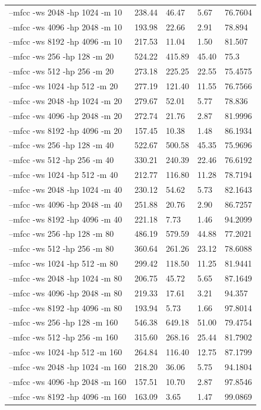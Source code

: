 \documentclass[12pt,oneside]{book}
\begin{document}
\begin{table}
\begin{tabular}{|l|l|l|l|l|}
--mfcc -ws 2048 -hp 1024 -m 10  &  238.44 &  46.47 &  5.67 &  76.7604 \\
--mfcc -ws 4096 -hp 2048 -m 10  &  193.98 &  22.66 &  2.91 &  78.894 \\
--mfcc -ws 8192 -hp 4096 -m 10  &  217.53 &  11.04 &  1.50 &  81.507 \\
--mfcc -ws 256  -hp 128  -m 20  &  524.22 & 415.89 & 45.40 &  75.3 \\
--mfcc -ws 512  -hp 256  -m 20  &  273.18 & 225.25 & 22.55 &  75.4575 \\
--mfcc -ws 1024 -hp 512  -m 20  &  277.19 & 121.40 & 11.55 &  76.7566 \\
--mfcc -ws 2048 -hp 1024 -m 20  &  279.67 &  52.01 &  5.77 &  78.836 \\
--mfcc -ws 4096 -hp 2048 -m 20  &  272.74 &  21.76 &  2.87 &  81.9996 \\
--mfcc -ws 8192 -hp 4096 -m 20  &  157.45 &  10.38 &  1.48 &  86.1934 \\
--mfcc -ws 256  -hp 128  -m 40  &  522.67 & 500.58 & 45.35 &  75.9696 \\
--mfcc -ws 512  -hp 256  -m 40  &  330.21 & 240.39 & 22.46 &  76.6192 \\
--mfcc -ws 1024 -hp 512  -m 40  &  212.77 & 116.80 & 11.28 &  78.7194 \\
--mfcc -ws 2048 -hp 1024 -m 40  &  230.12 &  54.62 &  5.73 &  82.1643 \\
--mfcc -ws 4096 -hp 2048 -m 40  &  251.88 &  20.76 &  2.90 &  86.7257 \\
--mfcc -ws 8192 -hp 4096 -m 40  &  221.18 &   7.73 &  1.46 &  94.2099 \\
--mfcc -ws 256  -hp 128  -m 80  &  486.19 & 579.59 & 44.88 &  77.2021 \\
--mfcc -ws 512  -hp 256  -m 80  &  360.64 & 261.26 & 23.12 &  78.6088 \\
--mfcc -ws 1024 -hp 512  -m 80  &  299.42 & 118.50 & 11.25 &  81.9441 \\
--mfcc -ws 2048 -hp 1024 -m 80  &  206.75 &  45.72 &  5.65 &  87.1649 \\
--mfcc -ws 4096 -hp 2048 -m 80  &  219.33 &  17.61 &  3.21 &  94.357 \\
--mfcc -ws 8192 -hp 4096 -m 80  &  193.94 &   5.73 &  1.66 &  97.8014 \\
--mfcc -ws 256  -hp 128  -m 160 &  546.38 & 649.18 & 51.00 &  79.4754 \\
--mfcc -ws 512  -hp 256  -m 160 &  315.60 & 268.16 & 25.44 &  81.7902 \\
--mfcc -ws 1024 -hp 512  -m 160 &  264.84 & 116.40 & 12.75 &  87.1799 \\
--mfcc -ws 2048 -hp 1024 -m 160 &  218.20 &  36.06 &  5.75 &  94.1804 \\
--mfcc -ws 4096 -hp 2048 -m 160 &  157.51 &  10.70 &  2.87 &  97.8546 \\
--mfcc -ws 8192 -hp 4096 -m 160 &  163.09 &   3.65 &  1.47 &  99.0869 \\


\end{tabular}
\end{table}
\end{document}
